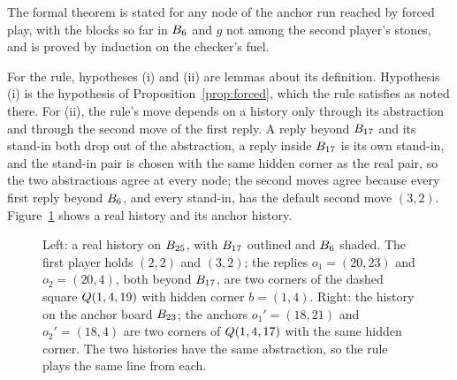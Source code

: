 \documentclass[11pt]{amsart}
\theoremstyle{definition}
\theoremstyle{remark}
\begin{document}
The formal theorem is stated for any node of the anchor run reached by
forced play, with the blocks so far in $B_6$ and $g$ not among
the second player's stones, and is proved by induction on the checker's
fuel.

For the rule, hypotheses (i) and (ii) are lemmas about its definition.
Hypothesis (i) is the hypothesis of Proposition~\ref{prop:forced},
which the rule satisfies as noted there. For
(ii), the rule's move depends on a history only through its
abstraction and through the second move of the first reply. A reply
beyond $B_{17}$ and its stand-in both drop out of the abstraction,
a reply inside $B_{17}$ is its own stand-in, and the stand-in pair
is chosen with the same hidden corner as the real pair, so the two
abstractions agree at every node; the second moves agree because every
first reply beyond $B_6$, and every stand-in, has the default
second move $(3,2)$. Figure~\ref{fig:agreement} shows a real history
and its anchor history.

\begin{figure}[ht]
\centering

\caption{Left: a real history on $B_{25}$, with $B_{17}$
outlined and $B_6$ shaded. The first player holds $(2,2)$
and $(3,2)$; the replies $o_1 = (20,23)$ and $o_2 = (20,4)$, both
beyond $B_{17}$, are two corners of the dashed square
$Q(1,4,19)$ with hidden corner $b = (1,4)$. Right: the history on
the anchor board $B_{23}$; the anchors $o_1' = (18,21)$ and
$o_2' = (18,4)$ are two corners of $Q(1,4,17)$ with the same hidden
corner. The two histories have the same abstraction, so the rule plays
the same line from each.}
\label{fig:agreement}
\end{figure}
\end{document}
